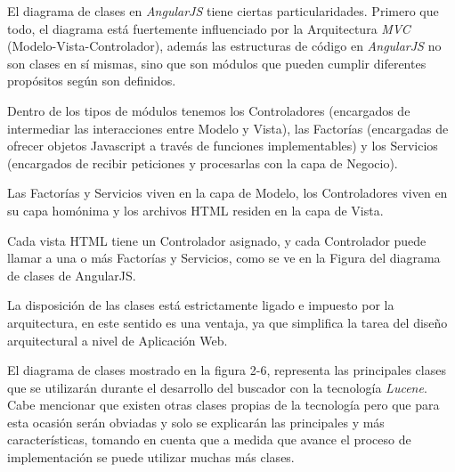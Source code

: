 \documentclass{memoria}
\begin{document}
El diagrama de clases en \textsl{AngularJS} tiene ciertas particularidades. Primero que todo, el diagrama está fuertemente influenciado por la Arquitectura \textsl{MVC} (Modelo-Vista-Controlador), además las estructuras de código en \textsl{AngularJS} no son clases en sí mismas, sino que son módulos que pueden cumplir diferentes propósitos según son definidos.

Dentro de los tipos de módulos tenemos los Controladores (encargados de intermediar las interacciones entre Modelo y Vista), las Factorías (encargadas de ofrecer objetos Javascript a través de funciones implementables) y los Servicios (encargados de recibir peticiones y procesarlas con la capa de Negocio).

Las Factorías y Servicios viven en la capa de Modelo, los Controladores viven en su capa homónima y los archivos HTML residen en la capa de Vista.

Cada vista HTML tiene un Controlador asignado, y cada Controlador puede llamar a una o más Factorías y Servicios, como se ve en la Figura del diagrama de clases de AngularJS.

La disposición de las clases está estrictamente ligado e impuesto por la arquitectura, en este sentido es una ventaja, ya que simplifica la tarea del diseño arquitectural a nivel de Aplicación Web.

\newpage
{}

El diagrama de clases mostrado en la figura 2-6, representa las principales clases que se utilizarán durante el desarrollo del buscador con la tecnología \textsl{Lucene}. Cabe mencionar que existen otras clases propias de la tecnología pero que para esta ocasión serán obviadas y solo se explicarán las principales y más características, tomando en cuenta que a medida que avance el proceso de implementación se puede utilizar muchas más clases.

\end{document}
